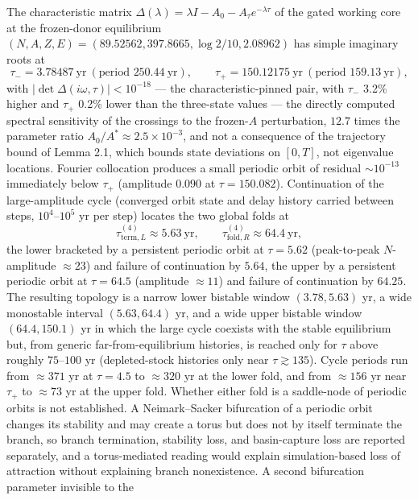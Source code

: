 \documentclass[11pt]{article}
\begin{document}
The characteristic matrix
\(\Delta(\lambda) = \lambda I - A_0 - A_\tau e^{-\lambda\tau}\) of the
gated working core at the frozen-donor equilibrium
\((N, A, Z, E) = (89.52562, 397.8665, \log 2/10, 2.08962)\) has simple
imaginary roots at
\[\tau_- = 3.78487\ \mathrm{yr}\ (\text{period }250.44\ \mathrm{yr}),\qquad \tau_+ = 150.12175\ \mathrm{yr}\ (\text{period }159.13\ \mathrm{yr}),\]
with \(|\det\Delta(i\omega, \tau)| < 10^{-18}\) --- the
characteristic-pinned pair, with \(\tau_-\) 3.2\% higher and \(\tau_+\)
0.2\% lower than the three-state values --- the directly computed
spectral sensitivity of the crossings to the frozen-\(A\) perturbation,
\(12.7\) times the parameter ratio \(A_0/A^* \approx 2.5\times10^{-3}\),
and not a consequence of the trajectory bound of Lemma 2.1, which bounds
state deviations on \([0,T]\), not eigenvalue locations. Fourier
collocation produces a small periodic orbit of residual \(\sim10^{-13}\)
immediately below \(\tau_+\) (amplitude \(0.090\) at
\(\tau = 150.082\)). Continuation of the large-amplitude cycle
(converged orbit state and delay history carried between steps,
\(10^4\)--\(10^5\) yr per step) locates the two global folds at
\[\tau_{\mathrm{term},L}^{(4)} \approx 5.63\ \mathrm{yr},\qquad \tau_{\mathrm{fold},R}^{(4)} \approx 64.4\ \mathrm{yr},\]
the lower bracketed by a persistent periodic orbit at \(\tau = 5.62\)
(peak-to-peak \(N\)-amplitude \(\approx23\)) and failure of continuation
by \(5.64\), the upper by a persistent periodic orbit at \(\tau = 64.5\)
(amplitude \(\approx11\)) and failure of continuation by \(64.25\). The
resulting topology is a narrow lower bistable window \((3.78, 5.63)\)
yr, a wide monostable interval \((5.63, 64.4)\) yr, and a wide upper
bistable window \((64.4, 150.1)\) yr in which the large cycle coexists
with the stable equilibrium but, from generic far-from-equilibrium
histories, is reached only for \(\tau\) above roughly \(75\)--\(100\) yr
(depleted-stock histories only near \(\tau \gtrsim 135\)). Cycle periods
run from \(\approx371\) yr at \(\tau = 4.5\) to \(\approx320\) yr at the
lower fold, and from \(\approx156\) yr near \(\tau_+\) to \(\approx73\)
yr at the upper fold. Whether either fold is a saddle-node of periodic
orbits is not established. A Neimark--Sacker bifurcation of a periodic
orbit changes its stability and may create a torus but does not by
itself terminate the branch, so branch termination, stability loss, and
basin-capture loss are reported separately, and a torus-mediated reading
would explain simulation-based loss of attraction without explaining
branch nonexistence. A second bifurcation parameter invisible to the
\end{document}
